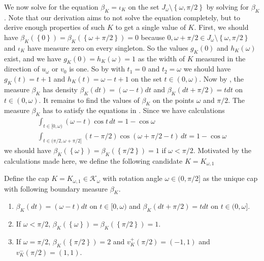 We now solve for the equation \(\beta_K = \iota_K\) on the set \(J_\omega \setminus \left\{ \omega, \pi/2 \right\}\) by solving for \(\beta_K\). Note that our derivation aims to not solve the equation completely, but to derive enough properties of such \(K\) to get a single value of \(K\). First, we should have \(\beta_K(\left\{ 0 \right\}) = \beta_K(\left\{ \omega + \pi/2 \right\}) = 0\) because \(0, \omega + \pi/2 \in J_\omega \setminus \left\{ \omega, \pi/2 \right\}\) and \(\iota_K\) have measure zero on every singleton. So the values \(g_K(0)\) and \(h_K(\omega)\) exist, and we have \(g_K(0) = h_K(\omega) = 1\) as the width of \(K\) measured in the direction of \(u_\omega\) or \(v_0\) is one. So by  with \(t_1 = 0\) and \(t_2 = \omega\) we should have \(g_K(t) = t + 1\) and \(h_K(t) = \omega - t + 1\) on the set \(t \in (0, \omega)\). Now by , the measure \(\beta_K\) has density \(\beta_K(dt) = (\omega - t) dt\) and \(\beta_K(dt + \pi/2) = t dt\) on \(t \in (0, \omega)\). It remains to find the values of \(\beta_K\) on the points \(\omega\) and \(\pi/2\). The measure \(\beta_K\) has to satisfy the equations in . Since we have calculations
\begin{gather*}
\label{eqn:k1-conditions}
\int_{t \in [0, \omega)} (\omega - t) \cos t  \, dt = 1 - \cos \omega \\
\int_{t \in (\pi/2, \omega + \pi/2]} (t - \pi/2) \cos\left( \omega + \pi/2 - t \right)  \, dt = 1 - \cos \omega
\end{gather*}
we should have \(\beta_K(\left\{ \omega \right\}) = \beta_K(\left\{ \pi/2 \right\}) = 1\) if \(\omega < \pi/2\). Motivated by the calculations made here, we define the following candidate \(K = K_{\omega, 1}\)

\begin{definition}

Define the cap \(K = K_{\omega, 1} \in \mathcal{K}_{\omega}\) with rotation angle \(\omega \in (0, \pi/2]\) as the unique cap with following boundary measure \(\beta_{K}\).

\begin{enumerate}
\def\labelenumi{\arabic{enumi}.}
\tightlist
\item
  \(\beta_{{K}}(dt) = (\omega -t)dt\) on \(t \in [0, \omega)\) and \(\beta_{K}(dt + \pi/2) = t dt\) on \(t \in (0, \omega]\).
\item
  If \(\omega < \pi/2\), \(\beta_K(\left\{ \omega \right\}) = \beta_K(\left\{ \pi/2 \right\}) = 1\).
\item
  If \(\omega = \pi/2\), \(\beta_K(\left\{ \pi/2 \right\}) = 2\) and \(v_K^+(\pi/2) = (-1, 1)\) and \(v_K^-(\pi/2) = (1, 1)\).
\end{enumerate}

\label{def:maximum-presofa-a1}
\end{definition}

